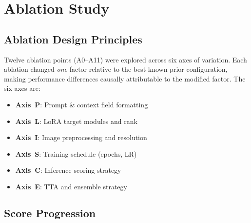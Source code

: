 \documentclass[11pt,twocolumn]{article}
\begin{document}
\section{Ablation Study}
\label{sec:ablations}

\subsection{Ablation Design Principles}

Twelve ablation points (A0--A11) were explored across six axes of variation. Each ablation changed \emph{one} factor relative to the best-known prior configuration, making performance differences causally attributable to the modified factor. The six axes are:

\begin{itemize}[leftmargin=*, noitemsep, topsep=2pt]
  \item \textbf{Axis~P}: Prompt \& context field formatting
  \item \textbf{Axis~L}: LoRA target modules and rank
  \item \textbf{Axis~I}: Image preprocessing and resolution
  \item \textbf{Axis~S}: Training schedule (epochs, LR)
  \item \textbf{Axis~C}: Inference scoring strategy
  \item \textbf{Axis~E}: TTA and ensemble strategy
\end{itemize}

\subsection{Score Progression}
\end{document}
